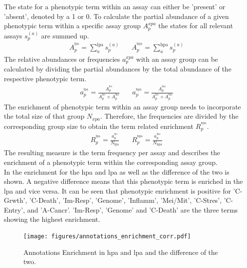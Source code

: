 The state for a phenotypic term within an assay can either be 'present' or 'absent', denoted by a \num{1} or \num{0}. To calculate the partial abundance of a given phenotypic term within a specific assay group $A_p^{xpa}$ the states for all relevant assays $s_p^{(a)}$ are summed up.
\begin{align}\label{eq:phenoabundance}
A_p^{^\text{lpa}} = \sum_{a}^\text{lpa}s_p^{(a)} \quad & A_p^{^\text{hpa}} = \sum_{a}^\text{hpa}s_p^{(a)}
\end{align}
The relative abundances or frequencies $a_p^{xpa}$ with an assay group can be calculated by dividing the partial abundances by the total abundance of the respective phenotypic term.
\begin{align}\label{eq:phenofreq}
a_p^{^\text{lpa}} = \frac{A_p^{^\text{lpa}}}{A_p^{^\text{lpa}}+A_p^{^\text{hpa}}} \quad & a_p^{^\text{hpa}} = \frac{A_p^{^\text{hpa}}}{A_p^{^\text{lpa}} + A_p^{^\text{hpa}}}
\end{align}
The enrichment of phenotypic term within an assay group needs to incorporate the total size of that group $N_{xpa}$. Therefore, the frequencies are divided by the corresponding group size to obtain the term related enrichment $R_p^{^\text{xpa}}$.
\begin{align}\label{eq:phenoenrichment}
R_p^{^\text{lpa}} = \frac{a_p^{^\text{lpa}}}{N_\text{lpa}} \quad & R_p^{^\text{hpa}} = \frac{a_p^{^\text{hpa}}}{N_\text{hpa}}
\end{align}
The resulting measure is the term frequency per assay and describes the enrichment of a phenotypic term within the corresponding assay group.\\
In  the enrichment for the \acl{hpa} and \acl{lpa} as well as the difference of the two is shown. A negative difference means that this phenotypic term is enriched in the \acl{lpa} and vice versa. It can be seen that phenotypic enrichment is positive for 'C-Grwth', 'C-Death', 'Im-Resp', 'Genome', 'Inflamm', 'Mei/Mit', 'C-Stres', 'C-Entry', and 'A-Cancr'. 'Im-Resp', 'Genome' and 'C-Death' are the three terms showing the highest enrichment.
\begin{figure}[H]
	\centering
	\texttt{[image: figures/annotations\_enrichment\_corr.pdf]}
	\caption[Annotations Enrichment in \acl{hpa} and \acl{lpa}]{Annotations Enrichment in \acl{hpa} and \acl{lpa} and the difference of the two. }
	\label{fig:annotenrich}
\end{figure}\noindent

